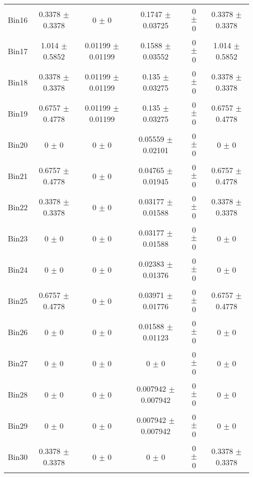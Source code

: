 \begin{tabular}{@{\extracolsep{4pt}}lccccc@{}}
     Bin16 & 0.3378 $\pm$ 0.3378 & 0 $\pm$ 0 & 0.1747 $\pm$ 0.03725 & 0 $\pm$ 0 & 0.3378 $\pm$ 0.3378 \\ 
     Bin17 & 1.014 $\pm$ 0.5852 & 0.01199 $\pm$ 0.01199 & 0.1588 $\pm$ 0.03552 & 0 $\pm$ 0 & 1.014 $\pm$ 0.5852 \\ 
     Bin18 & 0.3378 $\pm$ 0.3378 & 0.01199 $\pm$ 0.01199 & 0.135 $\pm$ 0.03275 & 0 $\pm$ 0 & 0.3378 $\pm$ 0.3378 \\ 
     Bin19 & 0.6757 $\pm$ 0.4778 & 0.01199 $\pm$ 0.01199 & 0.135 $\pm$ 0.03275 & 0 $\pm$ 0 & 0.6757 $\pm$ 0.4778 \\ 
     Bin20 & 0 $\pm$ 0 & 0 $\pm$ 0 & 0.05559 $\pm$ 0.02101 & 0 $\pm$ 0 & 0 $\pm$ 0 \\ 
     Bin21 & 0.6757 $\pm$ 0.4778 & 0 $\pm$ 0 & 0.04765 $\pm$ 0.01945 & 0 $\pm$ 0 & 0.6757 $\pm$ 0.4778 \\ 
     Bin22 & 0.3378 $\pm$ 0.3378 & 0 $\pm$ 0 & 0.03177 $\pm$ 0.01588 & 0 $\pm$ 0 & 0.3378 $\pm$ 0.3378 \\ 
     Bin23 & 0 $\pm$ 0 & 0 $\pm$ 0 & 0.03177 $\pm$ 0.01588 & 0 $\pm$ 0 & 0 $\pm$ 0 \\ 
     Bin24 & 0 $\pm$ 0 & 0 $\pm$ 0 & 0.02383 $\pm$ 0.01376 & 0 $\pm$ 0 & 0 $\pm$ 0 \\ 
     Bin25 & 0.6757 $\pm$ 0.4778 & 0 $\pm$ 0 & 0.03971 $\pm$ 0.01776 & 0 $\pm$ 0 & 0.6757 $\pm$ 0.4778 \\ 
     Bin26 & 0 $\pm$ 0 & 0 $\pm$ 0 & 0.01588 $\pm$ 0.01123 & 0 $\pm$ 0 & 0 $\pm$ 0 \\ 
     Bin27 & 0 $\pm$ 0 & 0 $\pm$ 0 & 0 $\pm$ 0 & 0 $\pm$ 0 & 0 $\pm$ 0 \\ 
     Bin28 & 0 $\pm$ 0 & 0 $\pm$ 0 & 0.007942 $\pm$ 0.007942 & 0 $\pm$ 0 & 0 $\pm$ 0 \\ 
     Bin29 & 0 $\pm$ 0 & 0 $\pm$ 0 & 0.007942 $\pm$ 0.007942 & 0 $\pm$ 0 & 0 $\pm$ 0 \\ 
     Bin30 & 0.3378 $\pm$ 0.3378 & 0 $\pm$ 0 & 0 $\pm$ 0 & 0 $\pm$ 0 & 0.3378 $\pm$ 0.3378 \\ 
\hline\hline
  \end{tabular}
